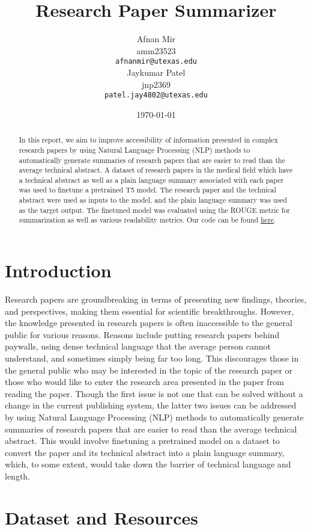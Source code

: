 \documentclass[11pt,a4paper]{article}
\title{Research Paper Summarizer}
\author{Afnan Mir \\
  amm23523 \\
  {\tt afnanmir@utexas.edu} \\\And
  Jaykumar Patel \\
  jnp2369 \\
  {\tt patel.jay4802@utexas.edu} \\}
\date{\today}
\begin{document}
\maketitle
\begin{abstract}
  In this report, we aim to improve accessibility of information presented in complex research papers by using Natural Language Processing (NLP) methods to automatically generate summaries of research papers that are easier to read than the average technical abstract. A dataset of research papers in the medical field which have a technical abstract as well as a plain language summary associated with each paper was used to finetune a pretrained T5 model. The research paper and the technical abstract were used as inputs to the model, and the plain language summary was used as the target output. The finetuned model was evaluated using the ROUGE metric for summarization as well as various readability metrics. Our code can be found \href{https://github.com/afnanmmir/Research-Paper-Summarizer}{here}.
\end{abstract}

\section{Introduction}

Research papers are groundbreaking in terms of presenting new findings, theories, and perspectives, making them essential for scientific breakthroughs. However, the knowledge presented in research papers is often inaccessible to the general public for various reasons. Reasons include putting research papers behind paywalls, using dense technical language that the average person cannot understand, and sometimes simply being far too long. This discourages those in the general public who may be interested in the topic of the research paper or those who would like to enter the research area presented in the paper from reading the paper. Though the first issue is not one that can be solved without a change in the current publishing system, the latter two issues can be addressed by using Natural Language Processing (NLP) methods to automatically generate summaries of research papers that are easier to read than the average technical abstract. This would involve finetuning a pretrained model on a dataset to convert the paper and its technical abstract into a plain language summary, which, to some extent, would take down the barrier of technical language and length.
\section{Dataset and Resources}
\end{document}
